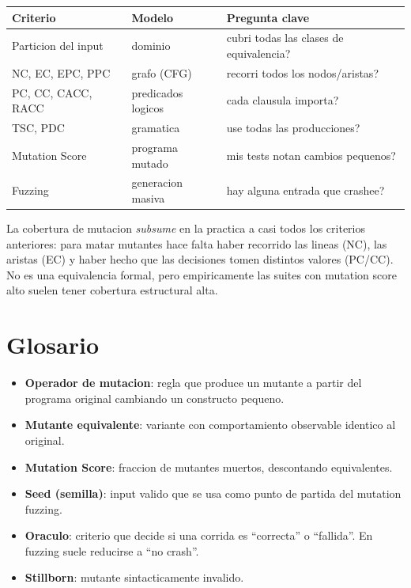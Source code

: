 \documentclass[12pt,a4paper]{article}
\begin{document}
\begin{center}
\begin{tabular}{lll}
\toprule
Criterio & Modelo & Pregunta clave \\
\midrule
Particion del input & dominio & \textquestiondown{}cubri todas las clases de equivalencia? \\
NC, EC, EPC, PPC & grafo (CFG) & \textquestiondown{}recorri todos los nodos/aristas? \\
PC, CC, CACC, RACC & predicados logicos & \textquestiondown{}cada clausula importa? \\
TSC, PDC & gramatica & \textquestiondown{}use todas las producciones? \\
Mutation Score & programa mutado & \textquestiondown{}mis tests notan cambios pequenos? \\
Fuzzing & generacion masiva & \textquestiondown{}hay alguna entrada que crashee? \\
\bottomrule
\end{tabular}
\end{center}

\begin{ideabox}
La cobertura de mutacion \emph{subsume} en la practica a casi todos los criterios anteriores:
para matar mutantes hace falta haber recorrido las lineas (NC), las aristas (EC) y haber
hecho que las decisiones tomen distintos valores (PC/CC). No es una equivalencia formal, pero
empiricamente las suites con mutation score alto suelen tener cobertura estructural alta.
\end{ideabox}

\section{Glosario}

\begin{itemize}
  \item \textbf{Operador de mutacion}: regla que produce un mutante a partir del programa
  original cambiando un constructo pequeno.
  \item \textbf{Mutante equivalente}: variante con comportamiento observable identico al
  original.
  \item \textbf{Mutation Score}: fraccion de mutantes muertos, descontando equivalentes.
  \item \textbf{Seed (semilla)}: input valido que se usa como punto de partida del mutation
  fuzzing.
  \item \textbf{Oraculo}: criterio que decide si una corrida es ``correcta'' o ``fallida''. En
  fuzzing suele reducirse a ``no crash''.
  \item \textbf{Stillborn}: mutante sintacticamente invalido.
\end{itemize}
\end{document}
